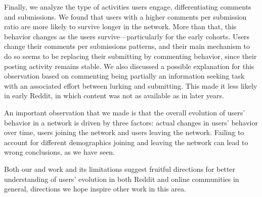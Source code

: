 Finally, we analyze the type of activities users engage, differentiating comments and submissions. 
We found that users with a higher comments per submission ratio are more likely to survive longer in the network. More than that, this behavior changes as the users survive---particularly for the early cohorts. Users change their comments per submissions patterns, and their main mechanism to do so seems to be replacing their submitting by commenting behavior, since their posting activity remains stable.
We also discussed a possible explanation for this observation based on commenting being partially an information seeking task with an associated effort between lurking and submitting. This made it less likely in early Reddit, in which content was not as available as in later years.

An important observation that we made is that the overall evolution of users' behavior in a network is driven by three factors: actual changes in users' behavior over time, users joining the network and users leaving the network. Failing to account for different demographics joining and leaving the network can lead to wrong conclusions, as we have seen.

Both our and work and its limitations suggest fruitful directions for better understanding of users' evolution in both Reddit and online communities in general, directions we hope inspire other work in this area.  
